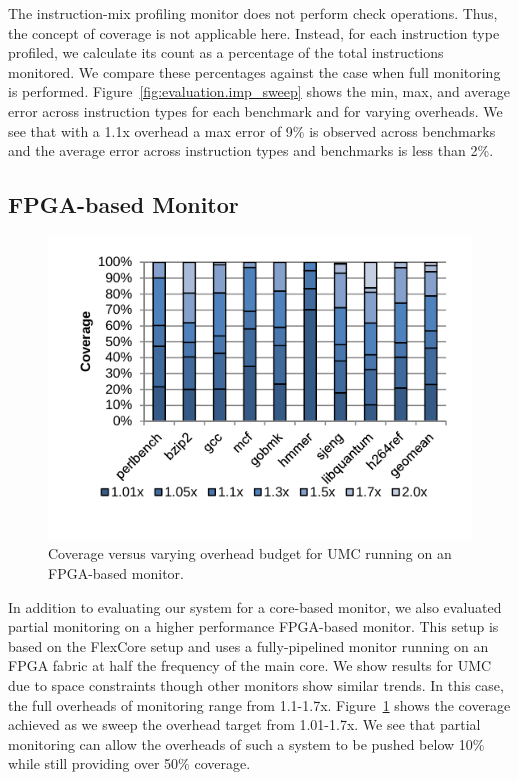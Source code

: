 The instruction-mix profiling monitor does not perform check operations. Thus,
the concept of coverage is not applicable here. Instead, for each instruction
type profiled, we calculate its count as a percentage of the total instructions
monitored. We compare these percentages against the case when full monitoring
is performed. Figure~\ref{fig:evaluation.imp_sweep} shows the min, max, and average error across
instruction types for each benchmark and for varying overheads. We see that
with a 1.1x overhead a max error of 9\% is observed across benchmarks and the
average error across instruction types and benchmarks is less than 2\%. 

\subsection{FPGA-based Monitor}
\label{sec:evaluation.fpga}

\begin{figure}
  \begin{center}
    \includegraphics[width=\linewidth, clip=true, trim=0 0.3in 0 0]{figs/data_fpga_umc_sweep.pdf}
    \vspace{-0.2in}
    \caption{Coverage versus varying overhead budget for UMC running on an FPGA-based monitor.}
    \label{fig:evaluation.fpga_umc_sweep}
    \vspace{-0.1in}
  \end{center}
\end{figure}

In addition to evaluating our system for a core-based monitor, we also
evaluated partial monitoring on a higher performance FPGA-based monitor. This
setup is based on the FlexCore \cite{flexcore-micro10} setup and uses a
fully-pipelined monitor running on an FPGA fabric at half the frequency of the
main core. We show results for UMC due to space constraints though other
monitors show similar trends. In this case, the full overheads of
monitoring range from 1.1-1.7x. Figure~\ref{fig:evaluation.fpga_umc_sweep} shows
the coverage achieved as we sweep the overhead target from 1.01-1.7x. We see that partial
monitoring can allow the overheads of such a system to be pushed below 10\%
while still providing over 50\% coverage.

